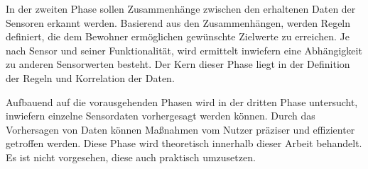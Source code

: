 In der zweiten Phase sollen Zusammenhänge zwischen den erhaltenen Daten der Sensoren erkannt werden. Basierend aus den Zusammenhängen, werden Regeln definiert, die dem Bewohner ermöglichen gewünschte Zielwerte zu erreichen. Je nach Sensor und seiner Funktionalität, wird ermittelt inwiefern eine Abhängigkeit zu anderen Sensorwerten besteht. Der Kern dieser Phase liegt in der Definition der Regeln und Korrelation der Daten.

Aufbauend auf die vorausgehenden Phasen wird in der dritten Phase untersucht, inwiefern einzelne Sensordaten vorhergesagt werden können. Durch das Vorhersagen von Daten können Maßnahmen vom Nutzer präziser und effizienter getroffen werden. Diese Phase wird theoretisch innerhalb dieser Arbeit behandelt. Es ist nicht vorgesehen, diese auch praktisch umzusetzen.